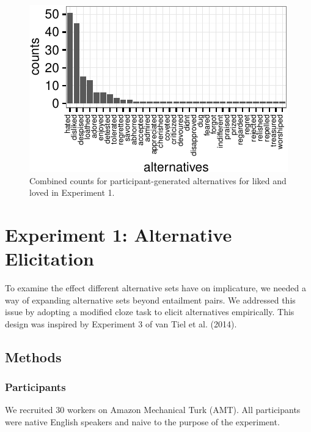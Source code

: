 \documentclass[10pt, letterpaper]{article}
\newenvironment{CodeChunk}{}{}
\begin{document}
\begin{CodeChunk}
\begin{figure}[t]

{\centering \includegraphics{figs/exp2_altsPlot_likedLoved-1} 

}

\caption[Combined counts for participant-generated alternatives for liked and loved in Experiment 1]{Combined counts for participant-generated alternatives for liked and loved in Experiment 1.}\label{fig:exp2_altsPlot_likedLoved}
\end{figure}
\end{CodeChunk}

\section{Experiment 1: Alternative
Elicitation}\label{experiment-1-alternative-elicitation}

To examine the effect different alternative sets have on implicature, we
needed a way of expanding alternative sets beyond entailment pairs. We
addressed this issue by adopting a modified cloze task to elicit
alternatives empirically. This design was inspired by Experiment 3 of
van Tiel et al. (2014).

\subsection{Methods}\label{methods}

\subsubsection{Participants}\label{participants}

We recruited 30 workers on Amazon Mechanical Turk (AMT). All
participants were native English speakers and naive to the purpose of
the experiment.
\end{document}
